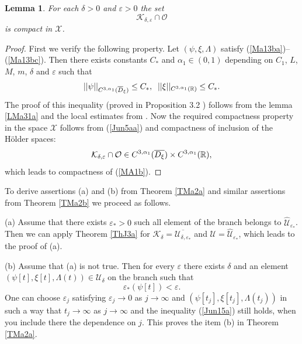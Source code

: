 \documentclass[a4paper,reqno,12pt]{amsart}
\theoremstyle{plain}
\newtheorem{lemma}[theorem]{Lemma}
\theoremstyle{definition}
\numberwithin{equation}{section}
\begin{document}
\begin{lemma}\label{LA29b} For each $\delta>0$ and $\varepsilon>0$ the set
\begin{equation}\label{MA1b}
{\mathcal K}_{\delta,\varepsilon}\cap {\mathcal O}
\end{equation}
is compact in ${\mathcal X}$.
\end{lemma}
\begin{proof} First we verify the following property.
Let $(\psi,\xi,\Lambda)$  satisfy (\ref{Ma13ba})--(\ref{Ma13bc}). Then
 there exists constants $C_*$ and $\alpha_1\in (0,1)$  depending  on $C_1$, $L$, $M$, $m$,  $\delta$ and $\varepsilon$ such that
\begin{equation}\label{Jun5aa}
||\psi||_{C^{3,\alpha_1}(\overline{D}_\xi)}\leq C_*,\;\;||\xi||_{C^{3,\alpha_1}(\Bbb R)}\leq C_*.
\end{equation}
The proof of this inequality (proved in Proposition 3.2 \cite{KL1}) follows from the lemma \ref{LMa31a} and the local estimates  from \cite{ADN}. Now the  required compactness property
in the space ${\mathcal X}$ follows from
(\ref{Jun5aa}) and compactness of inclusion of the H\"older spaces:
$$
{\mathcal K}_{\delta,\varepsilon}\cap {\mathcal O}\in C^{3,\alpha_1}(\overline{D_\xi})\times C^{3,\alpha_1}(\Bbb R),
$$
which leads to compactness of (\ref{MA1b}).
\end{proof}


To derive assertions (a) and (b) from Theorem \ref{TMa2a} and similar assertions from Theorem \ref{TMa2b} we proceed as follows.

(a) Assume that there exists $\varepsilon_*>0$  such all element of the branch belongs to $\widehat{\mathcal U}_{\varepsilon_*}$. Then we can apply Theorem \ref{ThJ3a}
for ${\mathcal K}_\delta=\overline{{\mathcal U}_{\delta,\varepsilon_*}}$ and ${\mathcal U}=\widehat{\mathcal U}_{\varepsilon_*}$, which leads to the proof of (a).

(b) Assume that (a) is not true. Then for every $\varepsilon$ there exists $\delta$ and
 an element $(\psi[t],\xi[t],\Lambda(t))\in {\mathcal U}_\delta$ on the branch such that
\begin{equation}\label{Jun15a}
 \varepsilon_*(\psi[t])<\varepsilon.
\end{equation}
One can choose $\varepsilon_j$ satisfying $\varepsilon_j\to 0$ as $j\to\infty$ and $(\psi[t_j],\xi[t_j],\Lambda(t_j))$  in such a way that $t_j\to\infty$ as $j\to\infty$ and the inequality (\ref{Jun15a}) still holds, when you include there the dependence on $j$. This proves the item (b) in Theorem \ref{TMa2a}.
\end{document}
